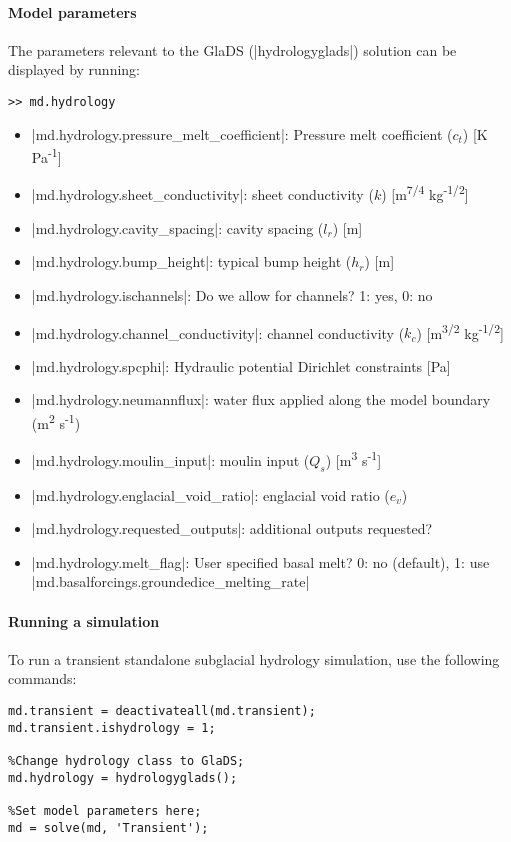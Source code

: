 \paragraph{Model parameters}
The parameters relevant to the GlaDS (\lstinlinebg|hydrologyglads|) solution can be displayed by running:
\begin{lstlisting}
>> md.hydrology
\end{lstlisting}

\begin{itemize}
	\item \lstinlinebg|md.hydrology.pressure_melt_coefficient|: Pressure melt coefficient ($c_t$) [K Pa\textsuperscript{-1}]
	\item \lstinlinebg|md.hydrology.sheet_conductivity|: sheet conductivity ($k$) [m\textsuperscript{7/4} kg\textsuperscript{-1/2}]
	\item \lstinlinebg|md.hydrology.cavity_spacing|: cavity spacing ($l_r$) [m]
	\item \lstinlinebg|md.hydrology.bump_height|: typical bump height ($h_r$) [m]
	\item \lstinlinebg|md.hydrology.ischannels|: Do we allow for channels? 1: yes, 0: no
	\item \lstinlinebg|md.hydrology.channel_conductivity|: channel conductivity ($k_c$) [m\textsuperscript{3/2} kg\textsuperscript{-1/2}]
	\item \lstinlinebg|md.hydrology.spcphi|: Hydraulic potential Dirichlet constraints [Pa]
	\item \lstinlinebg|md.hydrology.neumannflux|: water flux applied along the model boundary (m\textsuperscript{2} s\textsuperscript{-1})
	\item \lstinlinebg|md.hydrology.moulin_input|: moulin input ($Q_s$) [m\textsuperscript{3} s\textsuperscript{-1}]
	\item \lstinlinebg|md.hydrology.englacial_void_ratio|: englacial void ratio ($e_v$)
	\item \lstinlinebg|md.hydrology.requested_outputs|: additional outputs requested?
	\item \lstinlinebg|md.hydrology.melt_flag|: User specified basal melt? 0: no (default), 1: use \lstinlinebg|md.basalforcings.groundedice_melting_rate|
\end{itemize}

\paragraph{Running a simulation}
To run a transient standalone subglacial hydrology simulation, use the following commands:
\begin{lstlisting}
md.transient = deactivateall(md.transient);
md.transient.ishydrology = 1;

%Change hydrology class to GlaDS;
md.hydrology = hydrologyglads();

%Set model parameters here;
md = solve(md, 'Transient');
\end{lstlisting}

\clearpage %
